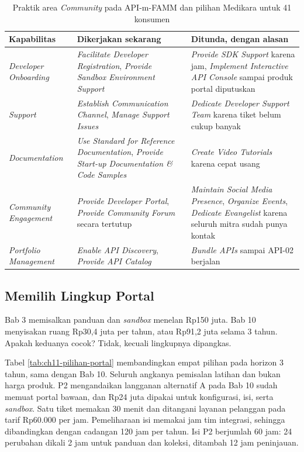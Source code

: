 \begin{table}[!htb]
  \centering
  \caption{Praktik area \textit{Community} pada API-m-FAMM dan pilihan Medikara untuk 41 konsumen}
  \label{tab:ch11-famm}
  \footnotesize
  \begin{tabularx}{\textwidth}{H{2.1cm}GG}
    \hline
    \textbf{Kapabilitas} & \textbf{Dikerjakan sekarang} & \textbf{Ditunda, dengan alasan} \\ \hline
    \textit{Developer Onboarding} & \textit{Facilitate Developer Registration}, \textit{Provide Sandbox Environment Support} & \textit{Provide SDK Support} karena jam, \textit{Implement Interactive API Console} sampai produk portal diputuskan \\ \hline
    \textit{Support} & \textit{Establish Communication Channel}, \textit{Manage Support Issues} & \textit{Dedicate Developer Support Team} karena tiket belum cukup banyak \\ \hline
    \textit{Documentation} & \textit{Use Standard for Reference Documentation}, \textit{Provide Start-up Documentation \& Code Samples} & \textit{Create Video Tutorials} karena cepat usang \\ \hline
    \textit{Community Engagement} & \textit{Provide Developer Portal}, \textit{Provide Community Forum} secara tertutup & \textit{Maintain Social Media Presence}, \textit{Organize Events}, \textit{Dedicate Evangelist} karena seluruh mitra sudah punya kontak \\ \hline
    \textit{Portfolio Management} & \textit{Enable API Discovery}, \textit{Provide API Catalog} & \textit{Bundle APIs} sampai API-02 berjalan \\ \hline
  \end{tabularx}
\end{table}

\subsection{Memilih Lingkup Portal}

Bab 3 memisalkan panduan dan \textit{sandbox} menelan Rp150 juta. Bab 10 menyisakan ruang Rp30,4 juta per tahun, atau Rp91,2
juta selama 3 tahun. Apakah keduanya cocok? Tidak, kecuali lingkupnya dipangkas.

Tabel \ref{tab:ch11-pilihan-portal} membandingkan empat pilihan pada horizon 3 tahun, sama dengan Bab 10. Seluruh angkanya
pemisalan latihan dan bukan harga produk. P2 mengandaikan langganan alternatif A pada Bab 10 sudah memuat portal bawaan, dan
Rp24 juta dipakai untuk konfigurasi, isi, serta \textit{sandbox}. Satu tiket memakan 30 menit dan ditangani layanan pelanggan pada
tarif Rp60.000 per jam. Pemeliharaan isi memakai jam tim integrasi, sehingga dibandingkan dengan cadangan 120 jam per tahun.
Isi P2 berjumlah 60 jam: 24 perubahan dikali 2 jam untuk panduan dan koleksi, ditambah 12 jam peninjauan.

